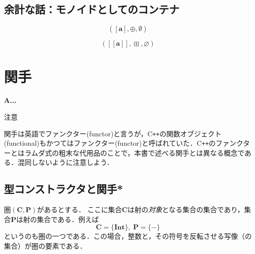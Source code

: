 \documentclass[twocolumn]{jsbook}
\def\[{\left[\!\left[}
\def\]{\right]\!\right]}
\newcommand{\programminglanguage}[1]{\textsf{#1}}
\newcommand{\cxx}{\programminglanguage{C}\texttt{++}}
\newcommand{\keyword}[1]{{\emph{#1}}}
\newenvironment{leader}{\begingroup\bf}{\endgroup}
\newcommand{\hsklType}[1]{\textbf{#1}}
\newcommand{\hsklAppend}{\oplus}
\DeclareMathOperator{\hsklMap}{\odot}
\DeclareMathOperator{\hsklMaybeAppend}{\boxplus}
\newcommand{\hsklEmptyList}{\emptyset}
\newcommand{\hsklNothing}{\varnothing}
\newcommand{\hsklInt}{\hsklType{Int}}
\newcommand{\hsklListType}[1]{[#1]}
\newcommand{\hsklMaybeType}[1]{\[#1\]}
\newcommand{\mathSet}[1]{\mathbf{#1}} %
\newcommand{\mathCategoryShort}[2]{(#1,#2)}
\newcommand{\mathMonoid}[3]{(#1,#2,#3)}
\begin{document}
\section{余計な話：モノイドとしてのコンテナ}

$$\mathMonoid{\hsklListType{\hsklType{a}}}{\hsklAppend}{\hsklEmptyList}$$

$$\mathMonoid{\hsklMaybeType{\hsklType{a}}}{\hsklMaybeAppend}{\hsklNothing}$$


\chapter{関手}
\label{ch:functor}

\begin{leader}
A...
\end{leader}

\begin{boxnote}
\begin{center}
注意
\end{center}
関手は英語でファンクター(functor)と言うが，\cxx の関数オブジェクト(functional)もかつてはファンクター(functor)と呼ばれていた．\cxx のファンクターとはラムダ式の粗末な代用品のことで，本書で述べる関手とは異なる概念である．混同しないように注意しよう．
\end{boxnote}


\section{型コンストラクタと関手*}

圏$\mathCategoryShort{\mathSet{C}}{\mathSet{P}}$があるとする．
ここに集合$\mathSet{C}$は射の\keyword{対象}となる集合の集合であり，集合$\mathSet{P}$は射の集合である．例えば$$\mathSet{C}=\{\hsklInt\},\;\mathSet{P}=\{-\}$$というのも圏の一つである．この場合，整数と，その符号を反転させる写像（の集合）が圏の要素である．

\end{document}
